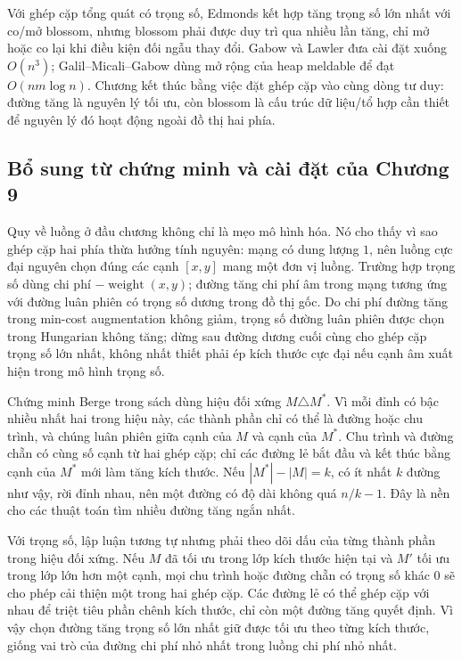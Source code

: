\documentclass[11pt]{article}
\begin{document}
Với ghép cặp tổng quát có trọng số, Edmonds kết hợp tăng trọng số lớn nhất với
co/mở blossom, nhưng blossom phải được duy trì qua nhiều lần tăng, chỉ mở hoặc
co lại khi điều kiện đối ngẫu thay đổi. Gabow và Lawler đưa cài đặt xuống
\(O(n^3)\); Galil--Micali--Gabow dùng mở rộng của heap meldable để đạt
\(O(nm\log n)\). Chương kết thúc bằng việc đặt ghép cặp vào cùng dòng tư duy:
đường tăng là nguyên lý tối ưu, còn blossom là cấu trúc dữ liệu/tổ hợp cần thiết
để nguyên lý đó hoạt động ngoài đồ thị hai phía.

\subsection*{Bổ sung từ chứng minh và cài đặt của Chương 9}

Quy về luồng ở đầu chương không chỉ là mẹo mô hình hóa. Nó cho thấy vì sao ghép
cặp hai phía thừa hưởng tính nguyên: mạng có dung lượng \(1\), nên luồng cực đại
nguyên chọn đúng các cạnh \([x,y]\) mang một đơn vị luồng. Trường hợp trọng số
dùng chi phí \(-\operatorname{weight}(x,y)\); đường tăng chi phí âm trong mạng
tương ứng với đường luân phiên có trọng số dương trong đồ thị gốc. Do chi phí
đường tăng trong min-cost augmentation không giảm, trọng số đường luân phiên được
chọn trong Hungarian không tăng; dừng sau đường dương cuối cùng cho ghép cặp
trọng số lớn nhất, không nhất thiết phải ép kích thước cực đại nếu cạnh âm xuất
hiện trong mô hình trọng số.

Chứng minh Berge trong sách dùng hiệu đối xứng \(M\triangle M^*\). Vì mỗi đỉnh
có bậc nhiều nhất hai trong hiệu này, các thành phần chỉ có thể là đường hoặc
chu trình, và chúng luân phiên giữa cạnh của \(M\) và cạnh của \(M^*\). Chu trình
và đường chẵn có cùng số cạnh từ hai ghép cặp; chỉ các đường lẻ bắt đầu và kết
thúc bằng cạnh của \(M^*\) mới làm tăng kích thước. Nếu \(|M^*|-|M|=k\), có ít
nhất \(k\) đường như vậy, rời đỉnh nhau, nên một đường có độ dài không quá
\(n/k-1\). Đây là nền cho các thuật toán tìm nhiều đường tăng ngắn nhất.

Với trọng số, lập luận tương tự nhưng phải theo dõi dấu của từng thành phần trong
hiệu đối xứng. Nếu \(M\) đã tối ưu trong lớp kích thước hiện tại và \(M'\) tối ưu
trong lớp lớn hơn một cạnh, mọi chu trình hoặc đường chẵn có trọng số khác \(0\)
sẽ cho phép cải thiện một trong hai ghép cặp. Các đường lẻ có thể ghép cặp với
nhau để triệt tiêu phần chênh kích thước, chỉ còn một đường tăng quyết định. Vì
vậy chọn đường tăng trọng số lớn nhất giữ được tối ưu theo từng kích thước, giống
vai trò của đường chi phí nhỏ nhất trong luồng chi phí nhỏ nhất.
\end{document}
